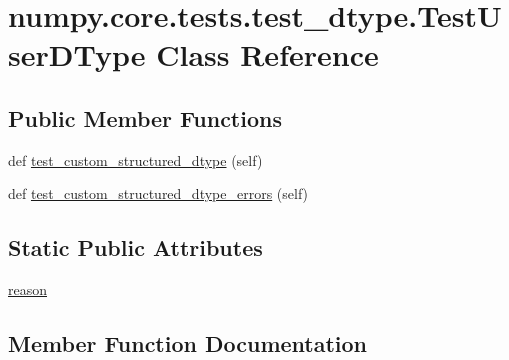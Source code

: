 \hypertarget{classnumpy_1_1core_1_1tests_1_1test__dtype_1_1TestUserDType}{}\section{numpy.\+core.\+tests.\+test\+\_\+dtype.\+Test\+User\+D\+Type Class Reference}
\label{classnumpy_1_1core_1_1tests_1_1test__dtype_1_1TestUserDType}
\subsection*{Public Member Functions}
\begin{DoxyCompactItemize}
\item 
def \hyperlink{classnumpy_1_1core_1_1tests_1_1test__dtype_1_1TestUserDType_ad83e66034f2fd33d7921290ca20a58bd}{test\+\_\+custom\+\_\+structured\+\_\+dtype} (self)
\item 
def \hyperlink{classnumpy_1_1core_1_1tests_1_1test__dtype_1_1TestUserDType_a9b05ab47b7efcb9542b03b5fd54b9ac7}{test\+\_\+custom\+\_\+structured\+\_\+dtype\+\_\+errors} (self)
\end{DoxyCompactItemize}
\subsection*{Static Public Attributes}
\begin{DoxyCompactItemize}
\item 
\hyperlink{classnumpy_1_1core_1_1tests_1_1test__dtype_1_1TestUserDType_add68ee9e4d245cbf6c6c00d57e5e441a}{reason}
\end{DoxyCompactItemize}


\subsection{Member Function Documentation}
\mbox{\label{classnumpy_1_1core_1_1tests_1_1test__dtype_1_1TestUserDType_ad83e66034f2fd33d7921290ca20a58bd}} 

